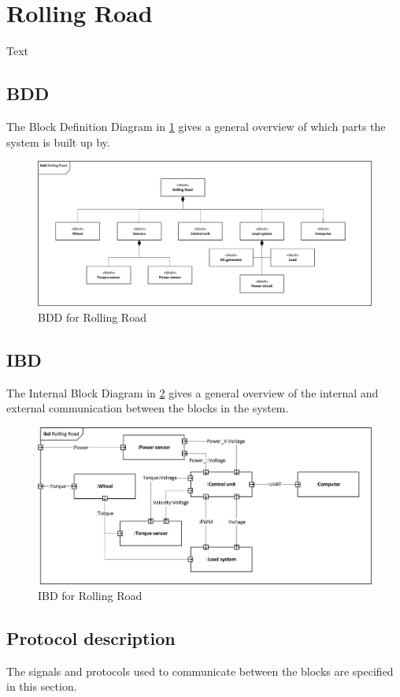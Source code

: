 \section{Rolling Road}
Text

\subsection{BDD}
The Block Definition Diagram in \ref{fig:RR_BDD} gives a general overview of which parts the system is built up by.

\begin{figure}[H]
	\centering
	\includegraphics[width=0.9\linewidth]{Architecture/BDD_RollingRoad}
	\caption{BDD for Rolling Road}
	\label{fig:RR_BDD}
\end{figure}

\subsection{IBD}
The Internal Block Diagram in \ref{fig:RR_IBD} gives a general overview of the internal and external communication between the blocks in the system.

\begin{figure}[H]
	\centering
	\includegraphics[width=0.9\linewidth]{Architecture/IBD_RollingRoad}
	\caption{IBD for Rolling Road}
	\label{fig:RR_IBD}
\end{figure}

\subsection{Protocol description}
The signals and protocols used to communicate between the blocks are specified in this section.


